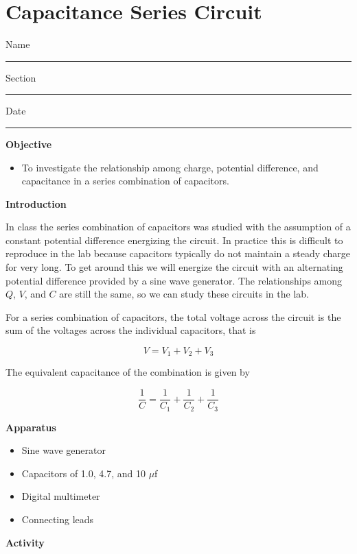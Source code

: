 
\section{Capacitance Series Circuit}
Name \rule{2.0in}{0.1pt}\hfill{}Section \rule{1.0in}{0.1pt}\hfill{}Date
\rule{1.0in}{0.1pt}

\textbf{Objective}

\begin{itemize}
\item To investigate the relationship among charge, potential difference, and capacitance in a series combination of capacitors.
\end{itemize}
\textbf{Introduction} 

In class the series combination of capacitors was studied with the assumption
of a constant potential difference energizing the circuit.  In practice this
is difficult to reproduce in the lab because capacitors typically do not
maintain a steady charge for very long.  To get around this we will energize
the circuit with an alternating potential difference provided by a sine wave
generator.  The relationships among $Q$, $V$, and $C$ are still the same, so
we can study these circuits in the lab.

For a series combination of capacitors, the total voltage across the circuit
is the sum of the voltages across the individual capacitors, that is

\begin{displaymath} V = V_1 + V_2 + V_3 \end{displaymath}

The equivalent capacitance of the combination is given by

\begin{displaymath} \frac{1}{C} = \frac{1}{C_1} + \frac{1}{C_2} + \frac{1}{C_3} \end{displaymath}

\textbf{Apparatus}

\begin{itemize}
\item Sine wave generator 
\item Capacitors of 1.0, 4.7, and 10 $\mu$f
\item Digital multimeter
\item Connecting leads
\end{itemize}
\textbf{Activity}


